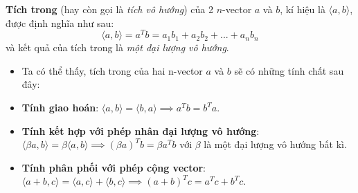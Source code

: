 \begin{defivn}
    \textbf{Tích trong} (hay còn gọi là \textit{tích vô hướng}) của 2 $n$-vector $a$ và $b$, kí hiệu là $\langle a, b \rangle$, được định nghĩa như sau:
    $$
    \langle a, b \rangle = a^Tb = a_1b_1 + a_2b_2 + ... + a_nb_n
    $$
    và kết quả của tích trong là \textit{một đại lượng vô hướng}.
\end{defivn}

\begin{itemize}
    \item[] Ta có thể thấy, tích trong của hai n-vector $a$ và $b$ sẽ có những tính chất sau đây:

    \item \textbf{Tính giao hoán}: $\langle a, b \rangle = \langle b, a \rangle \implies a^Tb = b^Ta$.
    \item \textbf{Tính kết hợp với phép nhân đại lượng vô hướng}: $\langle \beta a, b \rangle = \beta \langle a, b \rangle \implies (\beta a)^Tb = \beta a^Tb$ với $\beta$ là một đại lượng vô hướng bất kì.
    \item \textbf{Tính phân phối với phép cộng vector}: $\langle a + b, c \rangle = \langle a, c \rangle + \langle b, c \rangle \implies (a+b)^Tc = a^Tc + b^Tc$.
\end{itemize}







